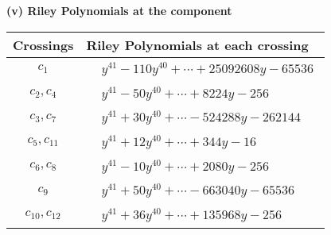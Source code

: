 \documentclass[1p]{elsarticle_modified}
\theoremstyle{definition}
\begin{document}
\flushleft \textbf{(v) Riley Polynomials at the component}\newline \\
\begin{tabular}{m{50pt}|m{274pt}}
Crossings & \hspace{64pt}Riley Polynomials at each crossing \\
\hline $$\begin{aligned}c_{1}\end{aligned}$$&$\begin{aligned}
&y^{41}-110 y^{40}+\cdots+25092608 y-65536
\end{aligned}$\\
\hline $$\begin{aligned}c_{2},c_{4}\end{aligned}$$&$\begin{aligned}
&y^{41}-50 y^{40}+\cdots+8224 y-256
\end{aligned}$\\
\hline $$\begin{aligned}c_{3},c_{7}\end{aligned}$$&$\begin{aligned}
&y^{41}+30 y^{40}+\cdots-524288 y-262144
\end{aligned}$\\
\hline $$\begin{aligned}c_{5},c_{11}\end{aligned}$$&$\begin{aligned}
&y^{41}+12 y^{40}+\cdots+344 y-16
\end{aligned}$\\
\hline $$\begin{aligned}c_{6},c_{8}\end{aligned}$$&$\begin{aligned}
&y^{41}-10 y^{40}+\cdots+2080 y-256
\end{aligned}$\\
\hline $$\begin{aligned}c_{9}\end{aligned}$$&$\begin{aligned}
&y^{41}+50 y^{40}+\cdots-663040 y-65536
\end{aligned}$\\
\hline $$\begin{aligned}c_{10},c_{12}\end{aligned}$$&$\begin{aligned}
&y^{41}+36 y^{40}+\cdots+135968 y-256
\end{aligned}$\\
\hline
\end{tabular}\\~\\
\end{document}

